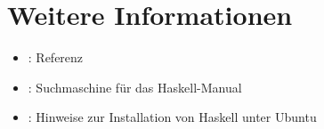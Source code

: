 \inputminted[numbersep=5pt, tabsize=4]{haskell}{scripts/haskell/standard-definitions.hs}

\section{Weitere Informationen}
\begin{itemize}
    \item \href{http://hackage.haskell.org/package/base-4.6.0.1}{}: Referenz
    \item \href{http://www.haskell.org/hoogle/}{}: Suchmaschine für das Haskell-Manual
    \item \href{http://wiki.ubuntuusers.de/Haskell}{}: Hinweise zur Installation von Haskell unter Ubuntu
\end{itemize}


